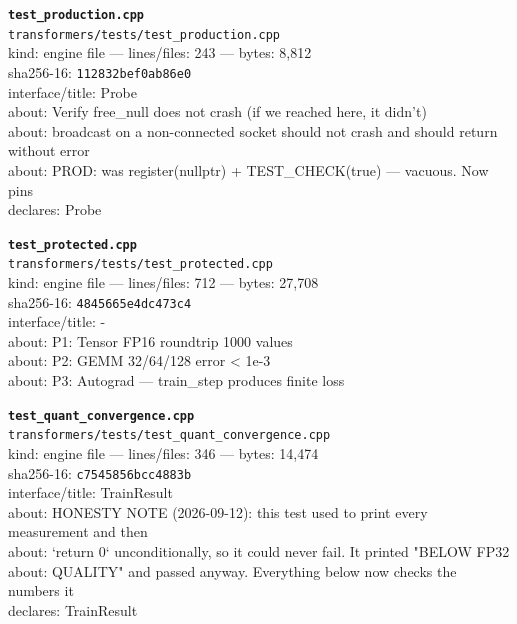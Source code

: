 \noindent\textbf{\texttt{test\_production.cpp}}\\
\texttt{transformers/tests/test\_production.cpp}\\
kind: engine file --- lines/files: 243 --- bytes: 8,812\\
sha256-16: \texttt{112832bef0ab86e0}\\
interface/title: Probe\\
about: Verify free\_null does not crash (if we reached here, it didn't)\\
about: broadcast on a non-connected socket should not crash and should return without error\\
about: PROD: was register(nullptr) + TEST\_CHECK(true) — vacuous. Now pins\\
declares: Probe\\
\vspace*{6.0pt}

\noindent\textbf{\texttt{test\_protected.cpp}}\\
\texttt{transformers/tests/test\_protected.cpp}\\
kind: engine file --- lines/files: 712 --- bytes: 27,708\\
sha256-16: \texttt{4845665e4dc473c4}\\
interface/title: -\\
about: P1: Tensor FP16 roundtrip 1000 values\\
about: P2: GEMM 32/64/128 error < 1e-3\\
about: P3: Autograd — train\_step produces finite loss\\
\vspace*{6.0pt}

\noindent\textbf{\texttt{test\_quant\_convergence.cpp}}\\
\texttt{transformers/tests/test\_quant\_convergence.cpp}\\
kind: engine file --- lines/files: 346 --- bytes: 14,474\\
sha256-16: \texttt{c7545856bcc4883b}\\
interface/title: TrainResult\\
about: HONESTY NOTE (2026-09-12): this test used to print every measurement and then\\
about: `return 0` unconditionally, so it could never fail. It printed "BELOW FP32\\
about: QUALITY" and passed anyway. Everything below now checks the numbers it\\
declares: TrainResult\\
\vspace*{6.0pt}
\newpage

